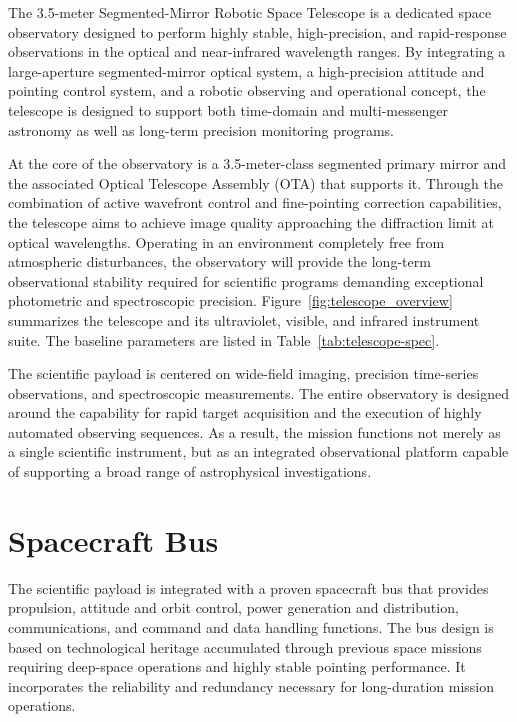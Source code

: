 The 3.5-meter Segmented-Mirror Robotic Space Telescope is a dedicated space observatory designed to perform highly stable, high-precision, and rapid-response observations in the optical and near-infrared wavelength ranges. By integrating a large-aperture segmented-mirror optical system, a high-precision attitude and pointing control system, and a robotic observing and operational concept, the telescope is designed to support both time-domain and multi-messenger astronomy as well as long-term precision monitoring programs.

At the core of the observatory is a 3.5-meter-class segmented primary mirror and the associated Optical Telescope Assembly (OTA) that supports it. Through the combination of active wavefront control and fine-pointing correction capabilities, the telescope aims to achieve image quality approaching the diffraction limit at optical wavelengths. Operating in an environment completely free from atmospheric disturbances, the observatory will provide the long-term observational stability required for scientific programs demanding exceptional photometric and spectroscopic precision. Figure~\ref{fig:telescope_overview} summarizes the telescope and its ultraviolet, visible, and infrared instrument suite. The baseline parameters are listed in Table~\ref{tab:telescope-spec}.


The scientific payload is centered on wide-field imaging, precision time-series observations, and spectroscopic measurements. The entire observatory is designed around the capability for rapid target acquisition and the execution of highly automated observing sequences. As a result, the mission functions not merely as a single scientific instrument, but as an integrated observational platform capable of supporting a broad range of astrophysical investigations.

\section{Spacecraft Bus}\label{spacecraft-bus}

The scientific payload is integrated with a proven spacecraft bus that provides propulsion, attitude and orbit control, power generation and distribution, communications, and command and data handling functions. The bus design is based on technological heritage accumulated through previous space missions requiring deep-space operations and highly stable pointing performance. It incorporates the reliability and redundancy necessary for long-duration mission operations.


